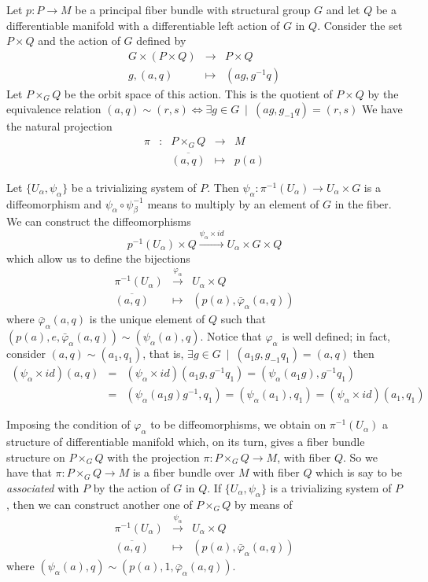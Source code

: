 \documentclass[12pt]{article}
\theoremstyle{plain}
\def\beann{\begin{eqnarray*}}
\def\eeann{\end{eqnarray*}}
\def\mapping#1{\mathrel{\mathop{\longrightarrow}\limits^{#1}}}
\begin{document}
Let $p : P \to M$ be
a principal fiber bundle with structural group $G$
and let $Q$ be a differentiable manifold
with a differentiable left action of $G$ in $Q$.
Consider the set $P \times Q$
and the action of $G$ defined by
$$\begin{array}{ccc}
G \times (P \times Q) & \to & P \times Q
\\
g,(a,q) & \mapsto & (ag, g^{-1}q)
\end{array}$$
Let $P \times_G Q$ be the orbit space of this action.
This is the quotient of $P \times Q$ by the equivalence relation
$(a,q) \sim (r,s) \Leftrightarrow \exists g \in G \
\mid \ (ag,g_{-1}q) = (r,s)$
We have the natural projection
$$
\begin{array}{ccccc}
\pi & : & P \times_G Q & \to & M
\\
& & \overline{(a,q)} & \mapsto & p(a)
\end{array}
$$

Let $\{ U_{\alpha},\psi_{\alpha} \}$ be
a trivializing system of $P$. Then
$\psi_{\alpha} : \pi^{-1}(U_{\alpha}) \to U_{\alpha} \times G$
is a diffeomorphism and
$\psi_{\alpha} \circ \psi_{\beta}^{-1}$
means to multiply by an element of $G$ in the fiber.
We can construct the diffeomorphisms
$$
p^{-1}(U_{\alpha}) \times Q \mapping{\psi_{\alpha} \times id}
U_{\alpha} \times G \times Q
$$
which allow us to define the bijections
$$\begin{array}{ccc}
\pi^{-1}(U_{\alpha}) & \mapping{\varphi_{\alpha}} & U_{\alpha} \times Q
\\
\overline{(a,q)} & \mapsto & (p(a),\bar\varphi_{\alpha}(a,q))
\end{array}$$
where $\bar\varphi_{\alpha}(a,q)$
is the unique element of $Q$ such that
$(p(a),e,\bar\varphi_{\alpha}(a,q)) \sim (\psi_{\alpha}(a),q)$.
Notice that $\varphi_{\alpha}$
is well defined; in fact,
consider $(a,q) \sim (a_1,q_1)$,
that is, $\exists g \in G \ \mid \ (a_1g,g_{-1}q_1) = (a,q)$
then
\beann
(\psi_{\alpha} \times id)(a,q) &=&
(\psi_{\alpha} \times id)(a_1g,g^{-1}q_1) =
(\psi_{\alpha}(a_1g),g^{-1}q_1)
\\ &=&
(\psi_{\alpha}(a_1g)g^{-1},q_1) =
(\psi_{\alpha}(a_1),q_1) =
(\psi_{\alpha} \times id)(a_1,q_1)
\eeann

Imposing the condition of $\varphi_{\alpha}$
to be diffeomorphisms,
we obtain on $\pi^{-1}(U_{\alpha})$
a structure of differentiable manifold which,
on its turn, gives a fiber bundle structure on
$P \times_G Q$ with the projection $\pi : P \times_G Q \to M$,
with fiber $Q$. So we have that $\pi : P \times_G Q \to M$
is a fiber bundle over $M$ with fiber $Q$ which is say to be
{\it associated} with $P$ by the action of $G$ in $Q$.
If $\{ U_{\alpha},\psi_{\alpha} \}$ is a trivializing system of $P$,
then we can construct another one of $P \times_G Q$
by means of
$$
\begin{array}{ccc}
\pi^{-1}(U_{\alpha}) & \mapping{\psi_{\alpha}} & U_{\alpha} \times Q
\\
\overline{(a,q)} & \mapsto & (p(a),\bar\varphi_{\alpha}(a,q))
\end{array}
$$
where $(\psi_{\alpha}(a),q) \sim (p(a),1,\bar\varphi_{\alpha}(a,q))$.
\end{document}

